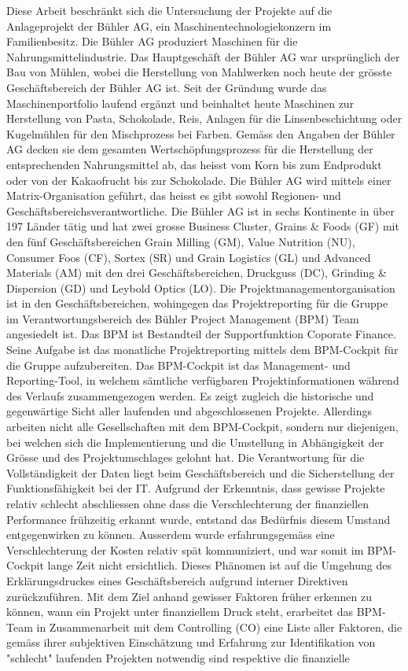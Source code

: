 \newline\newline Diese Arbeit beschränkt sich die Untersuchung der Projekte auf die Anlageprojekt der Bühler AG, ein Maschinentechnologiekonzern im Familienbesitz. Die Bühler AG produziert Maschinen für die Nahrungsmittelindustrie. Das Hauptgeschäft der Bühler AG war ursprünglich der Bau von Mühlen, wobei die Herstellung von Mahlwerken noch heute der grösste Geschäftsbereich der Bühler AG ist. Seit der Gründung wurde das Maschinenportfolio laufend ergänzt und beinhaltet heute Maschinen zur Herstellung von Pasta, Schokolade, Reis, Anlagen für die Linsenbeschichtung oder Kugelmühlen für den Mischprozess bei Farben. Gemäss den Angaben der Bühler AG decken sie dem gesamten Wertschöpfungsprozess für die Herstellung der entsprechenden Nahrungsmittel ab, das heisst vom Korn bis zum Endprodukt oder von der Kakaofrucht bis zur Schokolade. Die Bühler AG wird mittels einer Matrix-Organisation geführt, das heisst es gibt sowohl Regionen- und Geschäftsbereichsverantwortliche. Die Bühler AG ist in sechs Kontinente in über 197 Länder tätig und hat zwei grosse Business Cluster, Grains \& Foods (GF) mit den fünf Geschäftsbereichen Grain Milling (GM), Value Nutrition (NU), Consumer Foos (CF), Sortex (SR) und Grain Logistics (GL) und Advanced Materials (AM) mit den drei Geschäftsbereichen, Druckguss (DC), Grinding \& Dispersion (GD) und Leybold Optics (LO). Die Projektmanagementorganisation ist in den Geschäftsbereichen, wohingegen das Projektreporting für die Gruppe im Verantwortungsbereich des Bühler Project Management (BPM) Team angesiedelt ist. Das BPM ist Bestandteil der Supportfunktion Coporate Finance. Seine Aufgabe ist das monatliche Projektreporting mittels dem BPM-Cockpit für die Gruppe aufzubereiten. Das BPM-Cockpit ist das Management- und Reporting-Tool, in welchem sämtliche verfügbaren Projektinformationen während des Verlaufs zusammengezogen werden. Es zeigt zugleich die historische und gegenwärtige Sicht aller laufenden und abgeschlossenen Projekte. Allerdings arbeiten nicht alle Gesellschaften mit dem BPM-Cockpit, sondern nur diejenigen, bei welchen sich die Implementierung und die Umstellung in Abhängigkeit der Grösse und des Projektumschlages gelohnt hat. Die Verantwortung für die Vollständigkeit der Daten liegt beim Geschäftsbereich und die Sicherstellung der Funktionsfähigkeit bei der IT. Aufgrund der Erkenntnis, dass gewisse Projekte relativ schlecht abschliessen ohne dass die Verschlechterung der finanziellen Performance frühzeitig erkannt wurde, entstand das Bedürfnis diesem Umstand entgegenwirken zu können. Ausserdem wurde erfahrungsgemäss eine Verschlechterung der Kosten relativ spät kommuniziert, und war somit im BPM-Cockpit lange Zeit nicht ersichtlich. Dieses Phänomen ist auf die Umgehung des Erklärungsdruckes eines Geschäftsbereich aufgrund interner Direktiven zurückzuführen. Mit dem Ziel anhand gewisser Faktoren früher erkennen zu können, wann ein Projekt unter finanziellem Druck steht, erarbeitet das BPM-Team in Zusammenarbeit mit dem Controlling (CO) eine Liste aller Faktoren, die gemäss ihrer subjektiven Einschätzung und Erfahrung zur Identifikation von "schlecht" laufenden Projekten notwendig sind respektive die finanzielle 